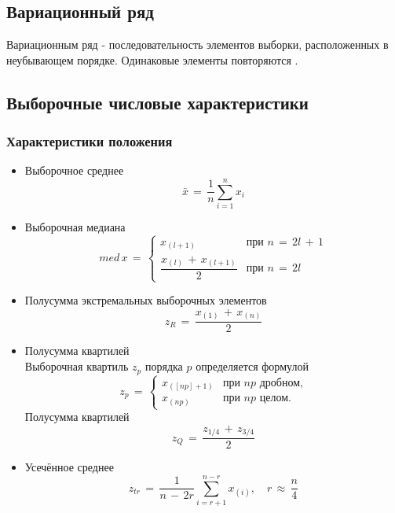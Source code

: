 \subsection{Вариационный ряд}
\begin{flushleft}
	Вариационным ряд - последовательность элементов выборки, расположенных в неубывающем порядке. Одинаковые элементы повторяются \cite[с.~409]{2}.
\end{flushleft}

\subsection{Выборочные числовые характеристики}
\subsubsection{Характеристики положения}
\begin{flushleft}
	\begin{itemize}
		\item Выборочное среднее
		\begin{equation}
			\label{8} \bar{x}\,=\,\frac{1}{n}\displaystyle\sum_{i=1}^{n} x_i
		\end{equation}
		\item Выборочная медиана
		\begin{equation}
			\label{9} med \, x \,=\,
			\begin{cases}
				x_{(l+1)} &\text{при $n \,=\,2l \,+\,1$}\\
				\dfrac{x_{(l)}\,+\,x_{(l+1)}}2 &\text{при $n \,=\,2l$}
			\end{cases}
		\end{equation}
		\item Полусумма экстремальных выборочных элементов
		\begin{equation}
			\label{10} z_R \,=\,\frac{x_{(1)}\,+\, x_{(n)}}{2}
		\end{equation}
		\item Полусумма квартилей \\
		Выборочная квартиль $ z_p $ порядка $ p $ определяется формулой
		\begin{equation}
			\label{11} z_p \,=\,
			\begin{cases}
				x_{(\left[np\right]+1)} &\text{при $np$ дробном,}\\
				x_{(np)} &\text{при $np$ целом.}
			\end{cases}
		\end{equation}
		Полусумма квартилей
		\begin{equation}
			\label{12} z_Q \,=\,\frac{z_{1/4}\,+\, z_{3/4}}{2}
		\end{equation}
		\item Усечённое среднее
		\begin{equation}
			\label{13} z_{tr} \,=\,\frac{1}{n \,-\,2r}\displaystyle\sum_{i=r+1}^{n-r} x_{(i)},\quad r \,\approx\,\frac{n}{4}
		\end{equation}
	\end{itemize}
\end{flushleft}

